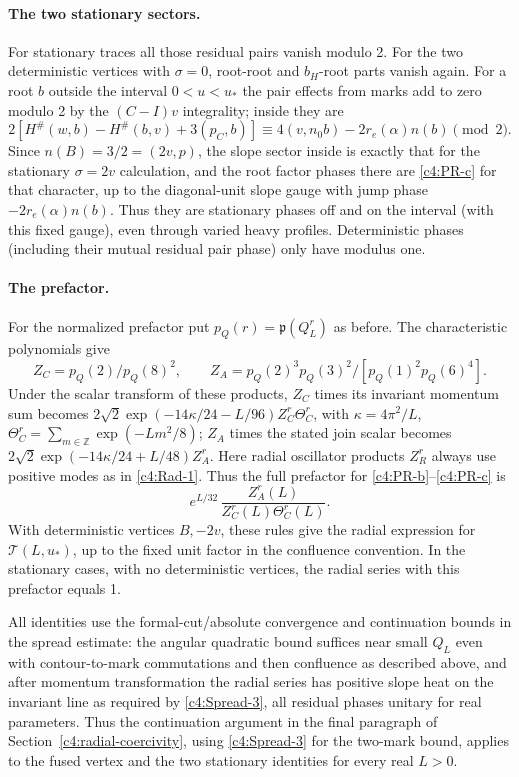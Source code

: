 \paragraph{The two stationary sectors.} For stationary traces all those residual pairs vanish modulo 2. For the two deterministic vertices with \(\sigma=0\), root-root and \(b_H\)-root parts vanish again. For a root \(b\) outside the interval \(0<u<u_*\) the pair effects from marks add to zero modulo 2 by the \((C-I)v\) integrality; inside they are
\[
       2[H^\#(w,b)-H^\#(b,v)+3(p_C,b)]\equiv
                      4(v,n_0 b)-2 r_e(\alpha)n(b) \pmod 2.
\]
Since \(n(B)=3/2=(2v,p)\), the slope sector inside is exactly that for the stationary \(\sigma=2v\) calculation, and the root factor phases there are \eqref{c4:PR-c} for that character, up to the diagonal-unit slope gauge with jump phase \(-2 r_e(\alpha)n(b)\). Thus they are stationary phases off and on the interval (with this fixed gauge), even through varied heavy profiles. Deterministic phases (including their mutual residual pair phase) only have modulus one.

\paragraph{The prefactor.} For the normalized prefactor put \(p_Q(r)=\mathfrak p(Q_L^r)\) as before. The characteristic polynomials give
\[
 Z_C=p_Q(2)/p_Q(8)^2,\qquad Z_A=p_Q(2)^3p_Q(3)^2/[p_Q(1)^2p_Q(6)^4].
\]
Under the scalar transform of these products, \(Z_C\) times its invariant momentum sum becomes
\(2\sqrt2\exp(-14\kappa/24-L/96)Z_C^r\Theta_C^r\), with \(\kappa=4\pi^2/L\), \(\Theta_C^r=\sum_{m\in\mathbb Z}\exp(-Lm^2/8)\); \(Z_A\) times the stated join scalar becomes \(2\sqrt2\exp(-14\kappa/24+L/48)Z_A^r\). Here radial oscillator products \(Z_R^r\) always use positive modes as in \eqref{c4:Rad-1}. Thus the full prefactor for \eqref{c4:PR-b}--\eqref{c4:PR-c} is
\begin{equation}
                         e^{L/32}\,\frac{Z_A^r(L)}{Z_C^r(L)\Theta_C^r(L)} .
                                                                  \label{c4:PR-d}
\end{equation}
With deterministic vertices \(B,-2v\), these rules give the radial
expression for \(\mathcal T(L,u_*)\), up to the fixed unit factor in the
confluence convention. In the stationary cases, with no deterministic
vertices, the radial series with this prefactor equals 1.

All identities use the formal-cut/absolute convergence and continuation bounds in the spread estimate: the angular quadratic bound suffices near small \(Q_L\) even with contour-to-mark commutations and then confluence as described above, and after momentum transformation the radial series has positive slope heat on the invariant line as required by \eqref{c4:Spread-3}, all residual phases unitary for real parameters. Thus the continuation argument in the final paragraph of
Section~\ref{c4:radial-coercivity}, using \eqref{c4:Spread-3} for the
two-mark bound, applies to the fused vertex and the two stationary
identities for every real $L>0$.

